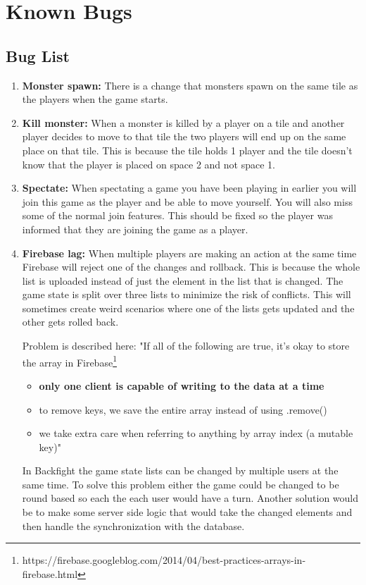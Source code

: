 \pagestyle{Uni}

\chapter{Known Bugs}

\section{Bug List}

\begin{enumerate}
	\item \textbf{Monster spawn:} There is a change that monsters spawn on the same tile as the players when the game starts.
	
	\item \textbf{Kill monster:} When a monster is killed by a player on a tile and another player decides to move to that tile the two players will end up on the same place on that tile. This is because the tile holds 1 player and the tile doesn't know that the player is placed on space 2 and not space 1.
		
	\item \textbf{Spectate:} When spectating a game you have been playing in earlier you will join this game as the player and be able to move yourself. You will also miss some of the normal join features. This should be fixed so the player was informed that they are joining the game as a player.

	\item \textbf{Firebase lag:} When multiple players are making an action at the same time Firebase will reject one of the changes and rollback. This is because the whole list is uploaded instead of just the element in the list that is changed. The game state is split over three lists to minimize the risk of conflicts. This will sometimes create weird scenarios where one of the lists gets updated and the other gets rolled back.
	
	Problem is described here: "If all of the following are true, it's okay to store the array in Firebase\footnote{https://firebase.googleblog.com/2014/04/best-practices-arrays-in-firebase.html}
	
	\begin{itemize}
		\item \textbf{only one client is capable of writing to the data at a time}
		\item to remove keys, we save the entire array instead of using .remove()
		\item we take extra care when referring to anything by array index (a mutable key)"
	\end{itemize}
	In Backfight the game state lists can be changed by multiple users at the same time. To solve this problem either the game could be changed to be round based so each the each user would have a turn. Another solution would be to make some server side logic that would take the changed elements and then handle the synchronization with the database.
	
\end{enumerate}